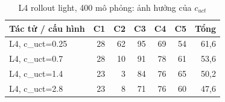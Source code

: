 \begin{table}[H]
  \centering
  \small
  \caption{L4 rollout light, 400 mô phỏng: ảnh hưởng của $c_{uct}$}
  \label{tab:cs-ct-cuct}
  \begin{tabular}{lrrrrrr}
    \toprule
    Tác tử / cấu hình & C1 & C2 & C3 & C4 & C5 & Tổng \\
    \midrule
    L4, c\_uct=0.25 & 28 & 62 & 95 & 69 & 54 & 61,6 \\
    L4, c\_uct=0.7 & 28 & 10 & 91 & 78 & 61 & 53,6 \\
    L4, c\_uct=1.4 & 23 & 3 & 84 & 76 & 65 & 50,2 \\
    L4, c\_uct=2.8 & 23 & 8 & 71 & 76 & 60 & 47,6 \\
    \bottomrule
  \end{tabular}
\end{table}
